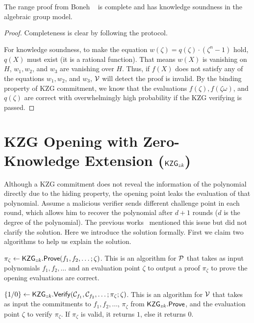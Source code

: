 \begin{lemma}
\label{lemma:range}
The range proof from Boneh \etal~\cite{rangeproof} is complete and has knowledge soundness in the algebraic group model.
\end{lemma}

\begin{proof}
Completeness is clear by following the protocol.

For knowledge soundness, to make the equation $w(\zeta)=q(\zeta)\cdot(\zeta^n-1)$ hold, $q(X)$ must exist (it is a rational function). That means $w(X)$ is vanishing on $H$, \ie $w_1,w_2$, and $w_3$ are vanishing over $H$. Thus, if $f(X)$ does not satisfy any of the equations $w_1,w_2$, and $w_3$, $\mathcal{V}$ will detect the proof is invalid. By the binding property of KZG commitment, we know that the evaluations $f(\zeta),f(\zeta\omega)$, and $q(\zeta)$ are correct with overwhelmingly high probability if the KZG verifying is passed.
\end{proof}

\section{KZG Opening with Zero-Knowledge Extension ($\mathsf{KZG}_{zk}$)}
\label{sec:kgzzkp}
Although a KZG commitment does not reveal the information of the polynomial directly due to the hiding property, the opening point leaks the evaluation of that polynomial. Assume a malicious verifier sends different challenge point in each round, which allows him to recover the polynomial after $d+1$ rounds ($d$ is the degree of the polynomial). The previous works~\cite{rangeproof,linear} mentioned this issue but did not clarify the solution. Here we introduce the solution formally. First we claim two algorithms to help us explain the solution.

\begin{claim}
$\pi_\zeta\leftarrow\mathsf{KZG}_{zk}.\mathsf{Prove}(f_1,f_2,\dots;\zeta)$. This is an algorithm for $\mathcal{P}$ that takes as input polynomials $f_1,f_2,\dots$ and an evaluation point $\zeta$ to output a proof $\pi_\zeta$ to prove the opening evaluations are correct.
\end{claim}

\begin{claim}
$\{1/0\}\leftarrow\mathsf{KZG}_{zk}.\mathsf{Verify}(\mathcal{C}_{f_1},\mathcal{C}_{f_2},\dots;\pi_\zeta;\zeta)$. This is an algorithm for $\mathcal{V}$ that takes as input the commitments to $f_1,f_2,\dots$, $\pi_\zeta$ from $\mathsf{KZG}_{zk}.\mathsf{Prove}$, and the evaluation point $\zeta$ to verify $\pi_\zeta$. If $\pi_\zeta$ is valid, it returns $1$, else it returns $0$.
\end{claim}

